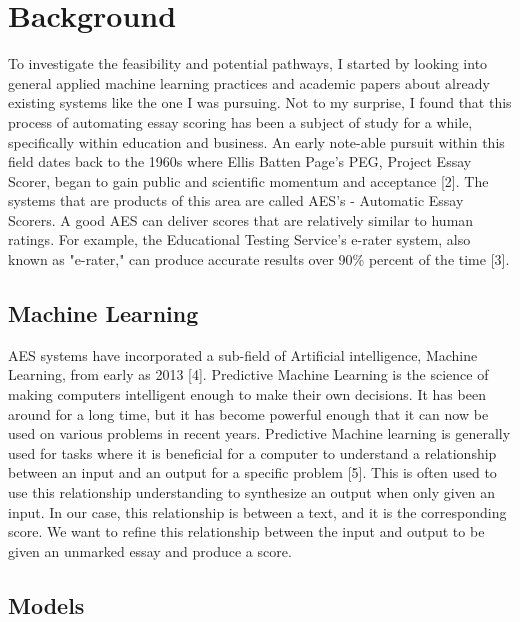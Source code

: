 \chapter{Background}\label{C:back}

To investigate the feasibility and potential pathways, I started by looking into general applied machine learning practices and academic papers about already existing systems like the one I was pursuing. Not to my surprise, I found that this process of automating essay scoring has been a subject of study for a while, specifically within education and business. An early note-able pursuit within this field dates back to the 1960s where Ellis Batten Page's PEG, Project Essay Scorer, began to gain public and scientific momentum and acceptance [2]. The systems that are products of this area are called AES's - Automatic Essay Scorers. A good AES can deliver scores that are relatively similar to human ratings. For example, the Educational Testing Service's e-rater system, also known as "e-rater," can produce accurate results over 90$\%$ percent of the time [3]. 

\section{Machine Learning}

AES systems have incorporated a sub-field of Artificial intelligence, Machine Learning, from early as 2013 [4]. Predictive Machine Learning is the science of making computers intelligent enough to make their own decisions. It has been around for a long time, but it has become powerful enough that it can now be used on various problems in recent years. Predictive Machine learning is generally used for tasks where it is beneficial for a computer to understand a relationship between an input and an output for a specific problem [5]. This is often used to use this relationship understanding to synthesize an output when only given an input. In our case, this relationship is between a text, and it is the corresponding score. We want to refine this relationship between the input and output to be given an unmarked essay and produce a score. 

\section{Models}

